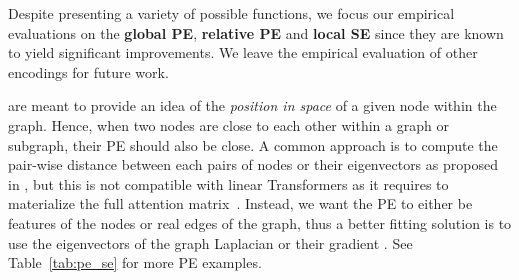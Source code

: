 \documentclass{article}
\begin{document}
Despite presenting a variety of possible functions, we focus our empirical evaluations on the \textbf{global PE}, \textbf{relative PE} and \textbf{local SE} since they are known to yield significant improvements. We leave the empirical evaluation of other encodings for future work.


  are meant to provide an idea of the \textit{position in space} of a given node within the graph. Hence, when two nodes are close to each other within a graph or subgraph, their PE should also be close. A common approach is to compute the pair-wise distance between each pairs of nodes or their eigenvectors as proposed in \cite{li2020distance, ying2021graphormer, kreuzer2021rethinking, wang2022equivstable}, but this is not compatible with linear Transformers as it requires to materialize the full attention matrix~\cite{DBLP:conf/iclr/ChoromanskiLDSG21}. Instead, we want the PE to either be features of the nodes or real edges of the graph, thus a better fitting solution is to use the eigenvectors of the graph Laplacian or their gradient \cite{dwivedi2020benchmarking, beaini2021directional_dgn, kreuzer2021rethinking}. See Table~\ref{tab:pe_se} for more PE examples.
\end{document}
